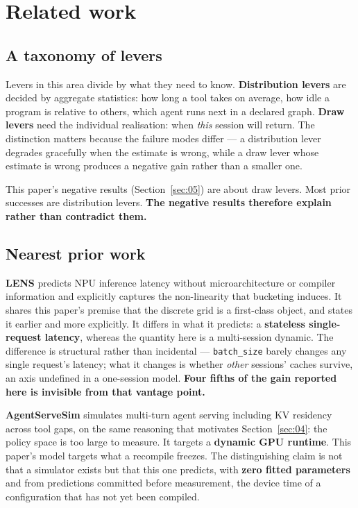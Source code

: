 
\section{Related work}
\label{sec:08}


\subsection{A taxonomy of levers}

Levers in this area divide by what they need to know. \textbf{Distribution levers} are decided by aggregate statistics: how long a tool takes on average, how idle a program is relative to others, which agent runs next in a declared graph. \textbf{Draw levers} need the individual realisation: when \emph{this} session will return. The distinction matters because the failure modes differ --- a distribution lever degrades gracefully when the estimate is wrong, while a draw lever whose estimate is wrong produces a negative gain rather than a smaller one.

This paper's negative results (Section~\ref{sec:05}) are about draw levers. Most prior successes are distribution levers. \textbf{The negative results therefore explain rather than contradict them.}

\subsection{Nearest prior work}

\textbf{LENS} \cite{lens2026} predicts NPU inference latency without microarchitecture or compiler information and explicitly captures the non-linearity that bucketing induces. It shares this paper's premise that the discrete grid is a first-class object, and states it earlier and more explicitly. It differs in what it predicts: a \textbf{stateless single-request latency}, whereas the quantity here is a multi-session dynamic. The difference is structural rather than incidental --- \texttt{batch\_size} barely changes any single request's latency; what it changes is whether \emph{other} sessions' caches survive, an axis undefined in a one-session model. \textbf{Four fifths of the gain reported here is invisible from that vantage point.}

\textbf{AgentServeSim} \cite{agentservesim2026} simulates multi-turn agent serving including KV residency across tool gaps, on the same reasoning that motivates Section~\ref{sec:04}: the policy space is too large to measure. It targets a \textbf{dynamic GPU runtime}. This paper's model targets what a recompile freezes. The distinguishing claim is not that a simulator exists but that this one predicts, with \textbf{zero fitted parameters} and from predictions committed before measurement, the device time of a configuration that has not yet been compiled.


